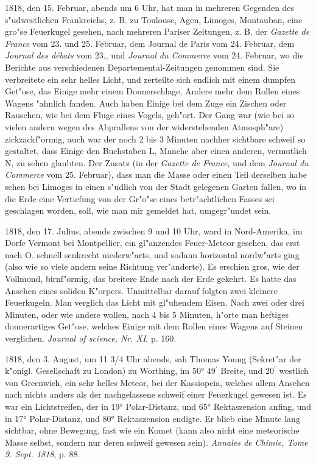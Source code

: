 \documentclass[a4paper, 11pt, oneside, polutonikogreek, german]{article}
\begin{document}
1818, den 15. Februar, abends um 6 Uhr, hat man in mehreren Gegenden des s"udwestlichen Frankreichs, z. B. zu Toulouse, Agen, Limoges, Montauban, eine gro"se Feuerkugel gesehen, nach mehreren Pariser Zeitungen, z. B. der \emph{Gazette de France} vom 23. und 25. Februar, dem Journal de Paris vom 24. Februar, dem \emph{Journal des débats} vom 23., und \emph{Journal du Commerce} vom 24. Februar, wo die Berichte aus verschiedenen Departemental-Zeitungen genommen sind. Sie verbreitete ein sehr helles Licht, und zerteilte sich endlich mit einem dumpfen Get"ose, das Einige mehr einem Donnerschlage, Andere mehr dem Rollen eines Wagens "ahnlich fanden. Auch haben Einige bei dem Zuge ein Zischen oder Rauschen, wie bei dem Fluge eines Vogels, geh"ort. Der Gang war (wie bei so vielen andern wegen des Abprallens von der widerstehenden Atmosph"are) zickzackf"ormig, auch war der noch 2 bis 3 Minuten nachher sichtbare schweif so gestaltet, dass Einige den Buchstaben L, Manche aber einen anderen, vermutlich N, zu sehen glaubten. Der Zusatz (in der \emph{Gazette de France}, und dem \emph{Journal du Commerce} vom 25. Februar), dass man die Masse oder einen Teil derselben habe sehen bei Limoges in einen s"udlich von der Stadt gelegenen Garten fallen, wo in die Erde eine Vertiefung von der Gr"o"se eines betr"achtlichen Fasses sei geschlagen worden, soll, wie man mir gemeldet hat, umgegr"undet sein.

1818, den 17. Julius, abends zwischen 9 und 10 Uhr, ward in Nord-Amerika, im Dorfe Vermont bei Montpellier, ein gl"anzendes Feuer-Meteor gesehen, das erst nach O. schnell senkrecht niederw"arts, und sodann horizontal nordw"arts ging (also wie so viele andern seine Richtung ver"anderte). Es erschien gros, wie der Vollmond, birnf"ormig, das breitere Ende nach der Erde gekehrt. Es hatte das Ansehen eines soliden K"orpers. Unmittelbar darauf folgten zwei kleinere Feuerkugeln. Man verglich das Licht mit gl"uhendem Eisen. Nach zwei oder drei Minuten, oder wie andere wollen, nach 4 bis 5 Minuten, h"orte man heftiges donnerartiges Get"ose, welches Einige mit dem Rollen eines Wagens auf Steinen verglichen. \emph{Journal of science, Nr. XI}, p. 160.

1818, den 3. August, um 11 3/4 Uhr abends, sah Thomas Young (Sekret"ar der k"onigl. Gesellschaft zu London) zu Worthing, im 50° 49$^{\prime}$ Breite, und 20$^{\prime}$ westlich von Greenwich, ein sehr helles Meteor, bei der Kassiopeia, welches allem Ansehen nach nichts anders als der nachgelassene schweif einer Feuerkugel gewesen ist. Es war ein Lichtstreifen, der in 19° Polar-Distanz, und 65° Rektaszension anfing, und in 17° Polar-Distanz, und 80° Rektaszension endigte. Er blieb eine Minute lang sichtbar, ohne Bewegung, fast wie ein Komet (kann also nicht eine meteorische Masse selbst, sondern nur deren schweif gewesen sein). \emph{Annales de Chimie, Tome 9. Sept. 1818}, p. 88.
\end{document}
